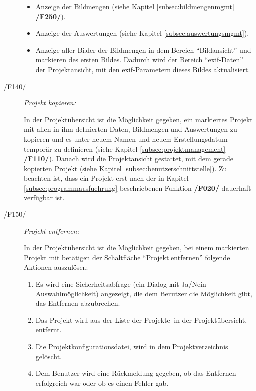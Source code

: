 \begin{description}
\begin{itemize}
				\item Anzeige der Bildmengen (siehe Kapitel \ref{subsec:bildmengenmgmt} \textbf{/F250/}).
				
				\item Anzeige der Auswertungen (siehe Kapitel \ref{subsec:auswertungsmgmt}).
				
				\item Anzeige aller Bilder der Bildmengen in dem Bereich "`Bildansicht"' und markieren des ersten Bildes. Dadurch wird der Bereich "`\gls{exif}-Daten"' der Projektansicht, mit den \gls{exif}-Parametern dieses Bildes aktualisiert.
			
			\end{itemize}		
		
		\item[/F140/] \textit{Projekt kopieren:}\par In der Projektübersicht ist die Möglichkeit gegeben, ein markiertes Projekt mit allen in ihm definierten Daten, Bildmengen und Auswertungen zu kopieren und es unter neuem Namen und neuem Erstellungsdatum temporär zu definieren (siehe Kapitel \ref{subsec:projektmanagement} \textbf{/F110/}). Danach wird die Projektansicht gestartet, mit dem gerade kopierten Projekt (siehe Kapitel \ref{subsec:benutzerschnittstelle}). Zu beachten ist, dass ein Projekt erst nach der in Kapitel \ref{subsec:programmausfuehrung} beschriebenen Funktion \textbf{/F020/} dauerhaft verfügbar ist.
		
		\item[/F150/] \textit{Projekt entfernen:}\par In der Projektübersicht ist die Möglichkeit gegeben, bei einem markierten Projekt mit betätigen der Schaltfläche "`Projekt entfernen"' folgende Aktionen auszulösen:
			
			\begin{enumerate}
				
				\item Es wird eine Sicherheitsabfrage (ein Dialog mit Ja/Nein Auswahlmöglichkeit) angezeigt, die dem Benutzer die Möglichkeit gibt, das Entfernen abzubrechen.
				
				\item Das Projekt wird aus der Liste der Projekte, in der Projektübersicht, entfernt.
				
				\item Die Projektkonfigurationsdatei, wird in dem Projektverzeichnis gelöscht.
				
				\item Dem Benutzer wird eine Rückmeldung gegeben, ob das Entfernen erfolgreich war oder ob es einen Fehler gab.
			

\end{enumerate}
\end{description}
